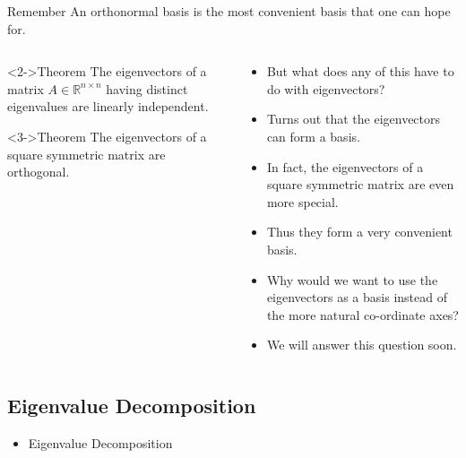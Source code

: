 \documentclass[10pt, aspectratio=169]{beamer}
\begin{document}
\begin{frame}
\begin{block}{Remember}
An orthonormal basis is the most convenient basis that one can hope for.
\end{block}
\end{frame}


\begin{frame}
  \begin{columns}

    \begin{column}{0.5\textwidth}
      \centering
	  \begin{block}<2->{Theorem}
	  The eigenvectors of a matrix $A \in \mathbb{R}^{n \times n}$ having distinct eigenvalues are linearly independent.
	  \end{block}
	  
	  
	  \begin{block}<3->{Theorem}
	  The eigenvectors of a square symmetric matrix are orthogonal.
	  \end{block}
    \end{column}
      

    \begin{column}{0.5\textwidth}
      \begin{itemize}
        \item<1-> But what does any of this have to do with eigenvectors?
		\item<2-> Turns out that the eigenvectors can form a basis.
		\item<3-> In fact, the eigenvectors of a square symmetric matrix are even more special.
		\item<4-> Thus they form a very convenient basis.
		\item<5-> Why would we want to use the eigenvectors as a basis instead of the more natural co-ordinate axes?
		\item<6-> We will answer this question soon.
        \end{itemize}
    \end{column}

  \end{columns}
\end{frame}

\subsection{Eigenvalue Decomposition}
\begin{frame}
\begin{itemize}
\item Eigenvalue Decomposition
\end{itemize}
\end{frame}
\end{document}
